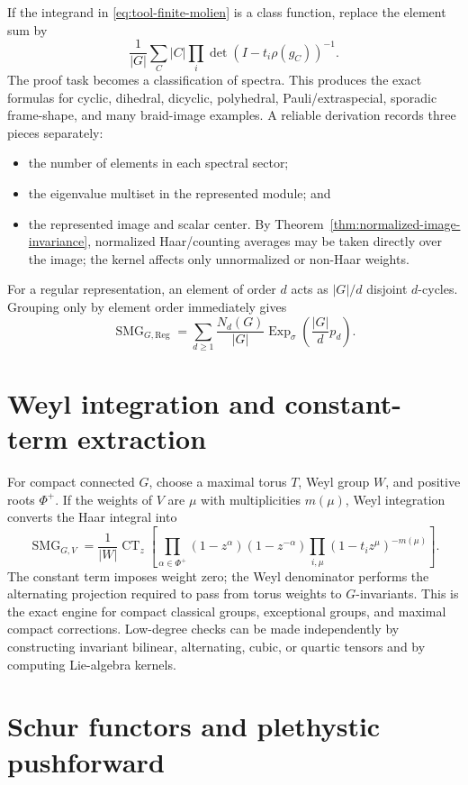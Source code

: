 \documentclass[10pt]{article}
\newcommand{\CT}{\operatorname{CT}}
\newcommand{\ExpS}{\operatorname{Exp}_{\sigma}}
\newcommand{\SMG}{\operatorname{SMG}}
\newcommand{\MGF}{\SMG}
\begin{document}
If the integrand in \eqref{eq:tool-finite-molien} is a class function, replace
the element sum by
\[
\frac1{|G|}\sum_{C}|C|\prod_i\det(I-t_i\rho(g_C))^{-1}.
\]
The proof task becomes a classification of spectra.  This produces the exact
formulas for cyclic, dihedral, dicyclic, polyhedral, Pauli/extraspecial,
sporadic frame-shape, and many braid-image examples.  A reliable derivation
records three pieces separately:
\begin{itemize}
\item the number of elements in each spectral sector;
\item the eigenvalue multiset in the represented module; and
\item the represented image and scalar center. By
Theorem~\ref{thm:normalized-image-invariance}, normalized Haar/counting
averages may be taken directly over the image; the kernel affects only
unnormalized or non-Haar weights.
\end{itemize}
For a regular representation, an element of order $d$ acts as $|G|/d$
disjoint $d$-cycles.  Grouping only by element order immediately gives
\[
\MGF_{G,\mathrm{Reg}}=
\sum_{d\ge1}\frac{N_d(G)}{|G|}
\ExpS\!\left(\frac{|G|}{d}p_d\right).
\]

\section{Weyl integration and constant-term extraction}

For compact connected $G$, choose a maximal torus $T$, Weyl group $W$, and
positive roots $\Phi^+$.  If the weights of $V$ are $\mu$ with multiplicities
$m(\mu)$, Weyl integration converts the Haar integral into
\begin{equation}\label{eq:tool-weyl}
\boxed{\MGF_{G,V}=\frac1{|W|}\CT_z\left[
\prod_{\alpha\in\Phi^+}(1-z^\alpha)(1-z^{-\alpha})
\prod_{i,\mu}(1-t_i z^\mu)^{-m(\mu)}\right].}
\end{equation}
The constant term imposes weight zero; the Weyl denominator performs the
alternating projection required to pass from torus weights to $G$-invariants.
This is the exact engine for compact classical groups, exceptional groups, and
maximal compact corrections.  Low-degree checks can be made independently by
constructing invariant bilinear, alternating, cubic, or quartic tensors and by
computing Lie-algebra kernels.

\section{Schur functors and plethystic pushforward}
\end{document}
